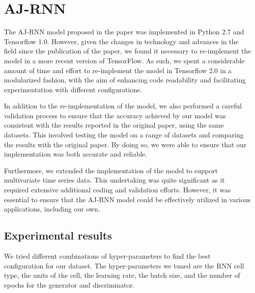 \section{AJ-RNN}

The AJ-RNN model proposed in the paper was implemented in Python 2.7 and Tensorflow 1.0.
However, given the changes in technology and advances in the field since the publication of the paper, we found it necessary to re-implement the model in a more recent version of TensorFlow.
As such, we spent a considerable amount of time and effort to re-implement the model in Tensorflow 2.0 in a modularized fashion, with the aim of enhancing code readability and facilitating experimentation with different configurations.

In addition to the re-implementation of the model, we also performed a careful validation process to ensure that the accuracy achieved by our model was consistent with the results reported in the original paper, using the same datasets. 
This involved testing the model on a range of datasets and comparing the results with the original paper. 
By doing so, we were able to ensure that our implementation was both accurate and reliable.

Furthermore, we extended the implementation of the model to support multivariate time series data. 
This undertaking was quite significant as it required extensive additional coding and validation efforts. 
However, it was essential to ensure that the AJ-RNN model could be effectively utilized in various applications, including our own.



\subsection{Experimental results}

We tried different combinations of hyper-parameters to find the best configuration for our dataset.
The hyper-parameters we tuned are the RNN cell type, the units of the cell, the learning rate, the batch size, and the number of epochs for the generator and discriminator.

